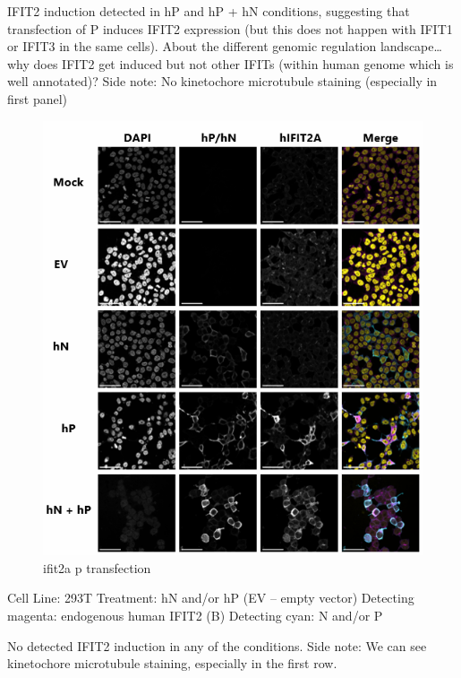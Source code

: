 IFIT2 induction detected in hP and hP + hN conditions, suggesting that transfection of P induces IFIT2 expression (but this does not happen with IFIT1 or IFIT3 in the same cells).
About the different genomic regulation landscape… why does IFIT2 get induced but not other IFITs (within human genome which is well annotated)? 
Side note: No kinetochore microtubule staining (especially in first panel)

\begin{figure}
    \centering
    \includegraphics[width=1\linewidth]{10. Chapter 5//Figs//04. IFIT2AB Discussion/03. ifit2a p transfection.png}
    \caption[ifit2a p transfection]{ifit2a p transfection}
    \label{fig:ifit2a p transfection}
\end{figure}

Cell Line: 293T \newline
Treatment: hN and/or hP (EV – empty vector) \newline
Detecting magenta: endogenous human IFIT2 (B) \newline
Detecting cyan: N and/or P \newline

No detected IFIT2 induction in any of the conditions.
Side note: We can see kinetochore microtubule staining, especially in the first row.

